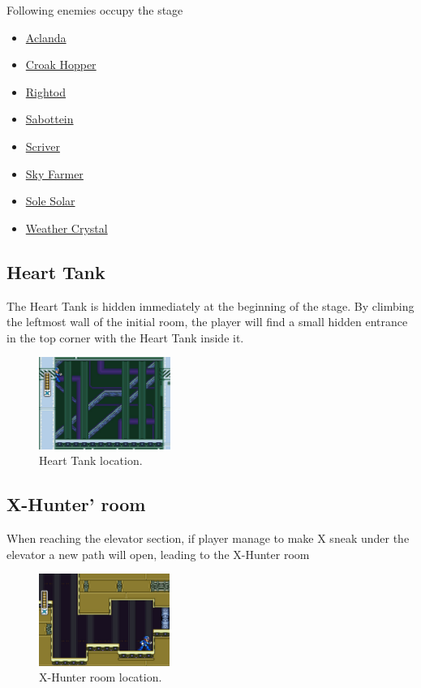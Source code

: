 Following enemies occupy the stage~\cite{wiki:weather_control}
\begin{itemize}
	\item \hyperlink{enem:Aclanda}{Aclanda}
	\item \hyperlink{enem:Croak_hopper}{Croak Hopper}
	\item \hyperlink{enem:Rightod}{Rightod}
	\item \hyperlink{enem:Sabottein}{Sabottein}
	\item \hyperlink{enem:Scriver}{Scriver}
	\item \hyperlink{enem:Sky_Farmer}{Sky Farmer}
	\item \hyperlink{enem:Sole_solar}{Sole Solar}
	\item \hyperlink{enem:Weather_crystal}{Weather Crystal}
\end{itemize}


\subsection{Heart Tank}
The Heart Tank is hidden immediately at the beginning of the stage. By climbing the leftmost wall of the initial room, the player will find a small hidden entrance in the top corner with the Heart Tank inside it.

\begin{figure}[htp]
	\centering
		\includegraphics[height=3cm]{figures/X2/Wire_sponge/Sponge_heart.jpg}
		\caption{Heart Tank location.}
\end{figure}

\subsection{X-Hunter' room}
When reaching the elevator section, if player manage to make X sneak under the elevator a new path will open, leading to the X-Hunter room
	\begin{figure}[htp]
	\centering
	\includegraphics[height=3cm]{figures/X2/Wire_sponge/Sponge_Hunter_room.jpg}
	\caption{X-Hunter room location.}
\end{figure}

